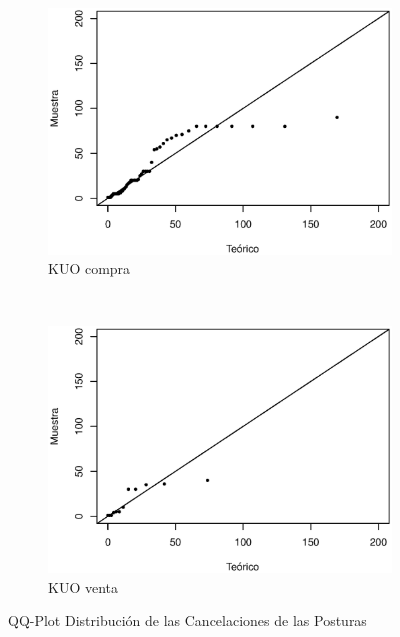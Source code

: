 \documentclass[11pt]{article}
\numberwithin{equation}{section} %
\begin{document}
\begin{figure}[htbp]
\begin{subfigure}[b]{0.5\textwidth}
\centering
\includegraphics[width=\textwidth, trim=0 0.5cm 0 1cm]{kuocanccompraqq.eps}
\caption{KUO compra}
\label{fig:kuocanccompraqq}
\end{subfigure}%
~ %
\begin{subfigure}[b]{0.5\textwidth}
\centering
\includegraphics[width=\textwidth, trim=0 0.5cm 0 1cm]{kuocancventaqq.eps}
\caption{KUO venta}
\label{fig:kuocancventaqq}
\end{subfigure}

\caption{QQ-Plot Distribución de las Cancelaciones de las Posturas}
\label{fig:cancqq}
\end{figure}
\end{document}

